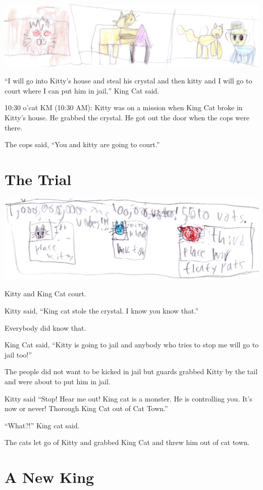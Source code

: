 \documentclass[12pt,oneside]{krantz}
\begin{document}
\includegraphics{img/cattriangle.jpg}

``I will go into Kitty's house and steal his crystal and then kitty and
I will go to court where I can put him in jail,'' King Cat said.

10:30 o'cat KM (10:30 AM): Kitty was on a mission when King Cat broke in
Kitty's house. He grabbed the crystal. He got out the door when the cops
were there.

The cops said, ``You and kitty are going to court.''

\hypertarget{the-trial}{%
\chapter{The Trial}\label{the-trial}}

\includegraphics{img/thirdplace.jpg}

Kitty and King Cat court.

Kitty said, ``King cat stole the crystal. I know you know that.''

Everybody did know that.

King Cat said, ``Kitty is going to jail and anybody who tries to stop me
will go to jail too!''

The people did not want to be kicked in jail but guards grabbed Kitty by
the tail and were about to put him in jail.

Kitty said ``Stop! Hear me out! King cat is a monster. He is controlling
you. It's now or never! Thorough King Cat out of Cat Town.''

``What?!'' King cat said.

The cats let go of Kitty and grabbed King Cat and threw him out of cat
town.

\hypertarget{a-new-king}{%
\chapter{A New King}\label{a-new-king}}
\end{document}
